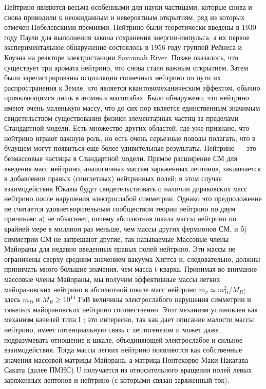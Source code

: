 \documentclass[a4paper,14pt]{extarticle}
\begin{document}
    Нейтрино являются весьма особенными для науки частицами, которые снова и снова 
    приводили к неожиданным и невероятным открытиям, ряд из которых отмечен Нобелевскими 
    премиями. Нейтрино были теоретически введены в 1930 году Паули для выполнения закона сохранения 
    энергии-импульса, а их первое экспериментальное обнаружение состоялось в 1956 году 
    группой Рейнеса и Коуэна на реакторе электростанции Savannah River. Позже оказалось, что существует три аромата нейтрино,
    что снова стало важным открытием. Затем были зарегистрированы осцилляции солнечных 
    нейтрино по пути их распространения к Земле, что является квантовомеханическим эффектом,
    обычно проявляющимся лишь в атомных масштабах. Было обнаружено, что нейтрино имеют 
    очень маленькую массу, что до сих пор является единственным значимым свидетельством
    существования физики элементарных частиц за пределами Стандартной модели. Есть множество других областей, где уже признано, 
    что нейтрино играют важную роль, но есть очень серьезные поводы полагать, что в будущем 
    могут появиться еще более удивительные результаты. Нейтрино — это безмассовые частицы в 
    Стандартной модели. Прямое расширение СМ для введения масс нейтрино, аналогичных массам 
    заряженных лептонов, заключается в добавлении правых (синглетных) нейтринных полей; в этом 
    случае  взаимодействия Юкавы будут свидетельствовать о наличии дираковских масс нейтрино 
    после нарушения электрослабой симметрии. Однако это предположение не считается удовлетворительным 
    сообществом теории нейтрино по двум причинам: а) не объясняет, почему абсолютная шкала 
    массы нейтрино по крайней мере в миллион раз меньше, чем массы других фермионов СМ, и 
    б) симметрии СМ не запрещают другие, так называемые Массовые члены Майораны для недавно 
    введенных правых полей нейтрино. Эти массы не ограничены сверху средним значением вакуума 
    Хиггса и, следовательно, должны принимать много большие значения, чем масса t-кварка. 
    Принимая во внимание массовые члены Майораны, мы получим эффективные массы легких майорановских 
    нейтрино в абсолютной шкале масс нейтрино $m_{\nu} \simeq m^2_D/M_R$; здесь $m_{D}$ и $M_R \geq 10^{14}$ ГэВ 
    величины электрослабого нарушения симметрии и тяжелых майорановских нейтрино соотвественно. 
    Этот механизм установлен как механизм качелей типа I \cite{minkowski} 
    \cite{https://doi.org/10.48550/arxiv.1306.4669}; это интересно, так как дает описание 
    малости массы нейтрино, имеет потенциальную связь с лептогенезом и может даже подразумевать 
    отношение к шкале, объединяющей электрослабое и сильное взаимодействия. Тогда массы легких 
    нейтрино появляются как собственные значения массовой матрицы Майорана, а матрица 
    Понтекорво-Маки-Накагава-Саката (далее ПМНС) U получается из относительного вращения полей 
    левых заряженных лептонов и нейтрино (с которыми связан заряженный ток).
    
\end{document}
